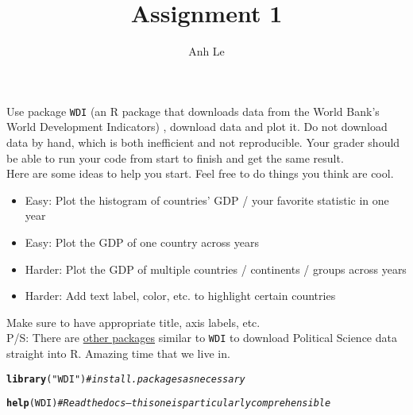\documentclass{article}\usepackage[]{graphicx}\usepackage[]{color}
\title{Assignment 1}
\author{Anh Le}
\makeatletter
\newcommand{\hlstr}[1]{\textcolor[rgb]{0.192,0.494,0.8}{#1}}%
\newcommand{\hlcom}[1]{\textcolor[rgb]{0.678,0.584,0.686}{\textit{#1}}}%
\newcommand{\hlstd}[1]{\textcolor[rgb]{0.345,0.345,0.345}{#1}}%
\newcommand{\hlkwd}[1]{\textcolor[rgb]{0.737,0.353,0.396}{\textbf{#1}}}%
\newenvironment{kframe}{%
 \def\at@end@of@kframe{}%
 \ifinner\ifhmode%
  \def\at@end@of@kframe{\end{minipage}}%
  \begin{minipage}{\columnwidth}%
 \fi\fi%
 \def\FrameCommand##1{\hskip\@totalleftmargin \hskip-\fboxsep
 \colorbox{shadecolor}{##1}\hskip-\fboxsep
     \hskip-\linewidth \hskip-\@totalleftmargin \hskip\columnwidth}%
 \MakeFramed {\advance\hsize-\width
   \@totalleftmargin\z@ \linewidth\hsize
   \@setminipage}}%
 {\par\unskip\endMakeFramed%
 \at@end@of@kframe}
\newenvironment{knitrout}{}{} %
\makeatother
\begin{document}
\maketitle

Use package \verb`WDI` (an R package that downloads data from the World Bank's World Development Indicators) , download data and plot it. Do not download data by hand, which is both inefficient and not reproducible. Your grader should be able to run your code from start to finish and get the same result.\\

Here are some ideas to help you start. Feel free to do things you think are cool.
\begin{itemize}
\item Easy: Plot the histogram of countries' GDP / your favorite statistic in one year
\item Easy: Plot the GDP of one country across years
\item Harder: Plot the GDP of multiple countries / continents / groups across years
\item Harder: Add text label, color, etc. to highlight certain countries
\end{itemize}

Make sure to have appropriate title, axis labels, etc.\\

P/S: There are \href{http://github.com/rOpenGov/psData}{other packages} similar to \verb`WDI` to download Political Science data straight into R. Amazing time that we live in.

\begin{knitrout}
\color{fgcolor}\begin{kframe}
\begin{alltt}
\hlkwd{library}\hlstd{(}\hlstr{"WDI"}\hlstd{)} \hlcom{# install.packages as necessary}
\end{alltt}


{\ttfamily\noindent\itshape\color{messagecolor}{\#\# Loading required package: RJSONIO}}\begin{alltt}
\hlkwd{help}\hlstd{(WDI)} \hlcom{# Read the docs -- this one is particularly comprehensible}
\end{alltt}
\end{kframe}
\end{knitrout}
\end{document}
